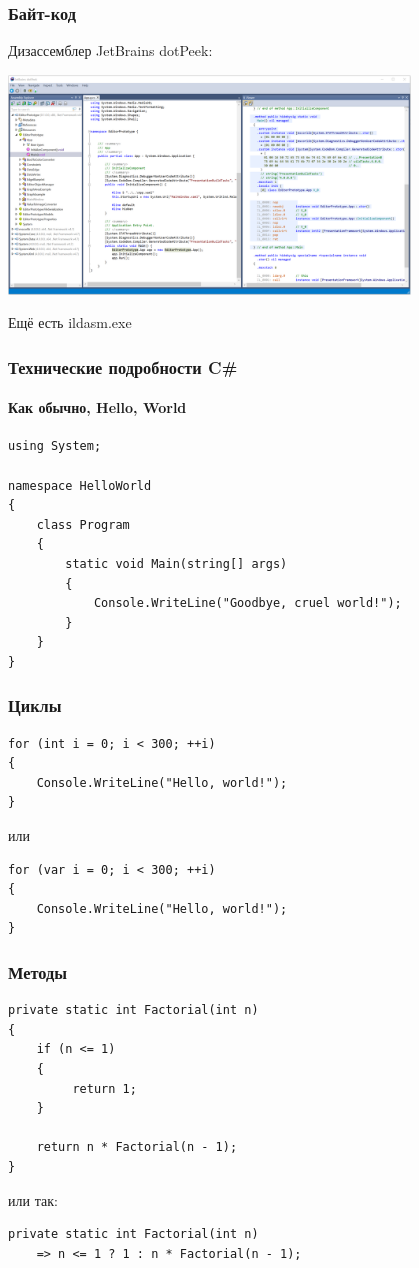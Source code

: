 \documentclass[xetex,mathserif,serif]{beamer}
\begin{document}
	\begin{frame}
		\frametitle{Байт-код}
		Дизассемблер JetBrains dotPeek:
		\begin{center}
			\includegraphics[width=0.8\textwidth]{dotPeek.png}
		\end{center}
		Ещё есть ildasm.exe
	\end{frame}

	\begin{frame}[fragile]
		\frametitle{Технические подробности C\#}
		\framesubtitle{Как обычно, Hello, World}
		\begin{verbatim}
using System;

namespace HelloWorld
{
    class Program
    {
        static void Main(string[] args)
        {
            Console.WriteLine("Goodbye, cruel world!");
        }
    }
}
		\end{verbatim}
\end{frame}

	\begin{frame}[fragile]
		\frametitle{Циклы}
		\begin{verbatim}
for (int i = 0; i < 300; ++i)
{
    Console.WriteLine("Hello, world!");
}
		\end{verbatim}
		или
		\begin{verbatim}
for (var i = 0; i < 300; ++i)
{
    Console.WriteLine("Hello, world!");
}
		\end{verbatim}
\end{frame}

	\begin{frame}[fragile]
		\frametitle{Методы}
		\begin{verbatim}
private static int Factorial(int n)
{
    if (n <= 1)
    {
         return 1;
    }

    return n * Factorial(n - 1);
}
		\end{verbatim}
		или так:
		\begin{verbatim}
private static int Factorial(int n) 
    => n <= 1 ? 1 : n * Factorial(n - 1);
		\end{verbatim}
\end{frame}
\end{document}

